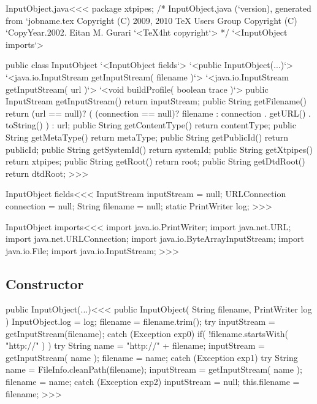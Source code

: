 \documentclass{article}
\begin{document}


\<InputObject.java\><<<
package xtpipes;
/* InputObject.java (`version), generated from `jobname.tex
   Copyright (C) 2009, 2010 TeX Users Group
   Copyright (C) `CopyYear.2002. Eitan M. Gurari
`<TeX4ht copyright`> */
`<InputObject imports`>

public class InputObject{
      `<InputObject fields`>
   `<public InputObject(...)`>
   `<java.io.InputStream getInputStream( filename )`>
   `<java.io.InputStream getInputStream( url )`>
   `<void buildProfile( boolean trace )`>
   public InputStream getInputStream(){ return inputStream; }
   public String getFilename(){
      return (url == null)?
         ( (connection == null)? filename
                               :
                                 connection . getURL() . toString()
         )
       : url;
   }
   public String getContentType(){ return contentType; }
   public String getMetaType(){ return metaType; }
   public String getPublicId(){ return publicId; }
   public String getSystemId(){ return systemId; }
   public String getXtpipes(){ return xtpipes; }
   public String getRoot(){ return root; }
   public String getDtdRoot(){ return dtdRoot; }
}
>>>

\<InputObject fields\><<<
InputStream inputStream = null;
URLConnection connection = null;
String filename = null;
static PrintWriter log;
>>>

\<InputObject imports\><<<
import java.io.PrintWriter;
import java.net.URL;
import java.net.URLConnection;
import java.io.ByteArrayInputStream;
import java.io.File;
import java.io.InputStream;
>>>

\subsection{Constructor}




\<public InputObject(...)\><<<
public InputObject( String filename, PrintWriter log ){
   InputObject.log = log;
   filename = filename.trim();
   try{
      inputStream = getInputStream(filename);
   } catch (Exception exp0){
      if( !filename.startsWith( "http://" ) ){
         try{
            String name = "http://" + filename;
            inputStream = getInputStream( name );
            filename = name;
         } catch (Exception exp1){
            try{
               String name = FileInfo.cleanPath(filename);
               inputStream = getInputStream( name );
               filename = name;
            } catch (Exception exp2){ inputStream = null; }
   }  }  }
   this.filename = filename;
}
>>>
\end{document}
